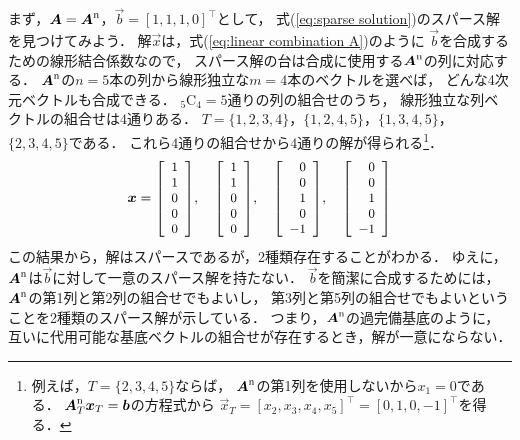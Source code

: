 まず，$\mtr A=\mtr A\msup{n}$，$\vec b=[1,1,1,0]^\top$として，
式(\ref{eq:sparse solution})のスパース解を見つけてみよう．
解$\vec x$は，式(\ref{eq:linear combination A})のように
$\vec b$を合成するための線形結合係数なので，
スパース解の台は合成に使用する$\mtr A\msup{n}$の列に対応する．
$\mtr A\msup{n}$の$n=5$本の列から線形独立な$m=4$本のベクトルを選べば，
どんな4次元ベクトルも合成できる．
${}_5$C${}_4=5$通りの列の組合せのうち，
線形独立な列ベクトルの組合せは$4$通りある．
$T=\{1,2,3,4\}$，$\{1,2,4,5\}$，$\{1,3,4,5\}$，$\{2,3,4,5\}$である．
これら$4$通りの組合せから$4$通りの解が得られる\footnote{%
例えば，$T=\{2,3,4,5\}$ならば，
$\mtr A\msup{n}$の第1列を使用しないから$x_1=0$である．
$\mtr A_T\msup{n}\vec x_T=\vec b$の方程式から
$\vec x_T=[x_2,x_3,x_4,x_5]^\top=[0,1,0,-1]^\top$を得る．}．
\begin{equation}
 \vec x=
\smatrix{\small}{r}{1 \\ 1 \\ 0 \\ 0 \\ 0},\quad
\smatrix{\small}{r}{1 \\ 1 \\ 0 \\ 0 \\ 0},\quad
\smatrix{\small}{r}{0 \\ 0 \\ 1 \\ 0 \\ -1},\quad
\smatrix{\small}{r}{0 \\ 0 \\ 1 \\ 0 \\ -1}
\end{equation}
この結果から，解はスパースであるが，2種類存在することがわかる．
ゆえに，$\mtr A\msup{n}$は$\vec b$に対して一意のスパース解を持たない．
$\vec b$を簡潔に合成するためには，
$\mtr A\msup{n}$の第1列と第2列の組合せでもよいし，
第3列と第5列の組合せでもよいということを2種類のスパース解が示している．
つまり，$\mtr A\msup{n}$の過完備基底のように，
互いに代用可能な基底ベクトルの組合せが存在するとき，解が一意にならない．



